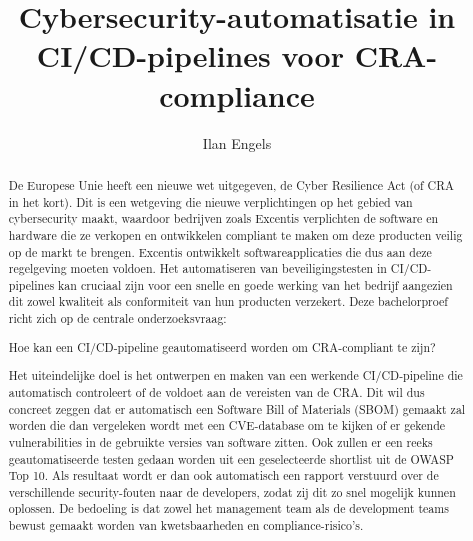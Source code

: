 \documentclass{hogent-article}
\title{Cybersecurity-automatisatie in CI/CD-pipelines voor CRA-compliance}
\author{Ilan Engels}
\begin{document}
\begin{abstract}
  De Europese Unie heeft een nieuwe wet uitgegeven, de Cyber Resilience Act (of CRA in het kort). Dit is een wetgeving die nieuwe verplichtingen op het gebied van cybersecurity maakt, waardoor bedrijven zoals Excentis verplichten de software en hardware die ze verkopen en ontwikkelen compliant te maken om deze producten veilig op de markt te brengen. Excentis ontwikkelt softwareapplicaties die dus aan deze regelgeving moeten voldoen. Het automatiseren van beveiligingstesten in CI/CD-pipelines kan cruciaal zijn voor een snelle en goede werking van het bedrijf aangezien dit zowel kwaliteit als conformiteit van hun producten verzekert. Deze bachelorproef richt zich op de centrale onderzoeksvraag: \begin{tcolorbox}[colback=hoofdkleur, colframe=hoofdkleur, boxrule=0pt, sharp corners, enhanced, breakable]Hoe kan een CI/CD-pipeline geautomatiseerd worden om CRA-compliant te zijn?\end{tcolorbox}Het uiteindelijke doel is het ontwerpen en maken van een werkende CI/CD-pipeline die automatisch controleert of de voldoet aan de vereisten van de CRA. Dit wil dus concreet zeggen dat er automatisch een Software Bill of Materials (SBOM) gemaakt zal worden die dan vergeleken wordt met een CVE-database om te kijken of er gekende vulnerabilities in de gebruikte versies van software zitten. Ook zullen er een reeks geautomatiseerde testen gedaan worden uit een geselecteerde shortlist uit de OWASP Top 10. Als resultaat wordt er dan ook automatisch een rapport verstuurd over de verschillende security-fouten naar de developers, zodat zij dit zo snel mogelijk kunnen oplossen. De bedoeling is dat zowel het management team als de development teams bewust gemaakt worden van kwetsbaarheden en compliance-risico’s.
\end{abstract}

\tableofcontents



\printbibliography[heading=bibintoc]
\end{document}
